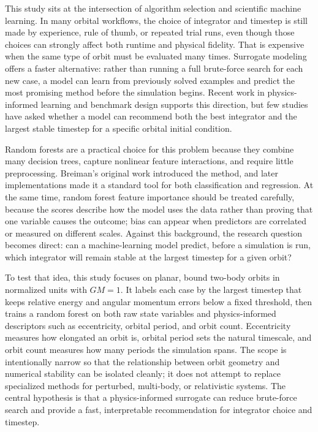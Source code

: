 \documentclass[12pt]{article}
\begin{document}
This study sits at the intersection of algorithm selection and scientific machine learning. In many orbital workflows, the choice of integrator and timestep is still made by experience, rule of thumb, or repeated trial runs, even though those choices can strongly affect both runtime and physical fidelity. That is expensive when the same type of orbit must be evaluated many times. Surrogate modeling offers a faster alternative: rather than running a full brute-force search for each new case, a model can learn from previously solved examples and predict the most promising method before the simulation begins. Recent work in physics-informed learning and benchmark design supports this direction, but few studies have asked whether a model can recommend both the best integrator and the largest stable timestep for a specific orbital initial condition\supercite{ghattas2021,karniadakis2021,raissi2019,kerschke2019,thiyagalingam2022}.

Random forests are a practical choice for this problem because they combine many decision trees, capture nonlinear feature interactions, and require little preprocessing. Breiman's original work introduced the method, and later implementations made it a standard tool for both classification and regression\supercite{breiman2001,liaw2002}. At the same time, random forest feature importance should be treated carefully, because the scores describe how the model uses the data rather than proving that one variable causes the outcome; bias can appear when predictors are correlated or measured on different scales\supercite{strobl2007}. Against this background, the research question becomes direct: can a machine-learning model predict, before a simulation is run, which integrator will remain stable at the largest timestep for a given orbit?

To test that idea, this study focuses on planar, bound two-body orbits in normalized units with $GM=1$. It labels each case by the largest timestep that keeps relative energy and angular momentum errors below a fixed threshold, then trains a random forest on both raw state variables and physics-informed descriptors such as eccentricity, orbital period, and orbit count. Eccentricity measures how elongated an orbit is, orbital period sets the natural timescale, and orbit count measures how many periods the simulation spans. The scope is intentionally narrow so that the relationship between orbit geometry and numerical stability can be isolated cleanly; it does not attempt to replace specialized methods for perturbed, multi-body, or relativistic systems. The central hypothesis is that a physics-informed surrogate can reduce brute-force search and provide a fast, interpretable recommendation for integrator choice and timestep.
\end{document}
